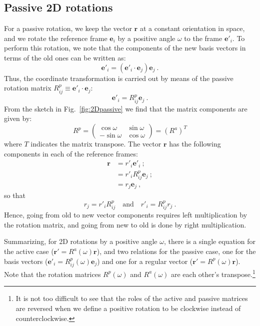 \subsection{Passive 2D rotations} For a passive rotation, we keep the vector $\mathbf{r}$ at a constant orientation in space, and we rotate the reference frame $\mathbf{e}_i$ by a positive angle $\omega$ to the frame $\mathbf{e}'_i$.  To perform this rotation, we note that the components of the new basis vectors in terms of the old ones can be written as:
\[
	\mathbf{e}'_i = (\mathbf{e}'_i\cdot\mathbf{e}_j)\mathbf{e}_j \ .
\]
Thus, the coordinate transformation is carried out by means of the passive rotation matrix $R^p_{ij}\equiv \mathbf{e}'_i\cdot\mathbf{e}_j$:
\[
	\mathbf{e}'_i = R^p_{ij}\mathbf{e}_j \ .
\]
From the sketch in Fig.~\ref{fig:2Dpassive} we find that the matrix components are given by:
\[
	R^p = \left(\begin{array}{cc}
	\cos\omega & \sin\omega\\
	-\sin\omega & \cos\omega\end{array}\right) = (R^a)^T
\]
where $T$ indicates  the matrix transpose.  The vector $\mathbf{r}$ has the following components in each of the reference frames:
\begin{align*}
	\mathbf{r} &= r'_i\mathbf{e}'_i\ ; \\
	&= r'_i R^p_{ij}\mathbf{e}_j\ ; \\
	&= r_j\mathbf{e}_j\ ,
\end{align*}
so that 
\[
	r_j = r'_i R^p_{ij}\quad\text{and}\quad r'_i = R^p_{ij} r_j\ .
\]
Hence, going from old to new vector components requires left multiplication by the rotation matrix, and going from new to old is done by right multiplication.

Summarizing, for 2D rotations by a positive angle $\omega$, there is a single equation for the active case ($\mathbf{r}'=R^a(\omega)\mathbf{r}$), and two relations for the passive case, one for the basis vectors ($\mathbf{e}'_i=R^p_{ij}(\omega)\mathbf{e}_j$) and one for a regular vector ($\mathbf{r}' = R^p(\omega)\mathbf{r}$).  Note that the rotation matrices $R^p(\omega)$ and $R^a(\omega)$ are each other's transpose.\footnote{It is not too difficult to see that the roles of the active and passive matrices are reversed when we define a positive rotation to be clockwise instead of counterclockwise.}

